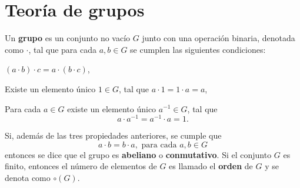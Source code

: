 \section{Teoría de grupos}
\begin{definicion}
Un \textbf{grupo} es un conjunto no vacío $G$ junto con una operación binaria, denotada como $\cdot$, tal que para cada $a,b \in G$ se cumplen las siguientes condiciones:
\begin{bulletList}
\item $(a\cdot b)\cdot c = a \cdot (b\cdot c)$,
\item Existe un elemento único $1\in G$, tal que $a\cdot 1 = 1 \cdot a = a$,
\item Para cada $a\in G$ existe un elemento único $a^{-1} \in G$, tal que \[a\cdot a^{-1} =a^{-1}\cdot a =1.\]
\end{bulletList}
Si, además de las tres propiedades anteriores, se cumple que \[ a\cdot b = b \cdot a , \mbox{ para cada } a,b \in G \] entonces se dice que el grupo es \textbf{abeliano}  o \textbf{conmutativo}. 
Si el conjunto $G$ es finito, entonces el número de elementos de $G$ es llamado el \textbf{orden} de $G$ y se denota como $\circ(G)$. 
\end{definicion}
